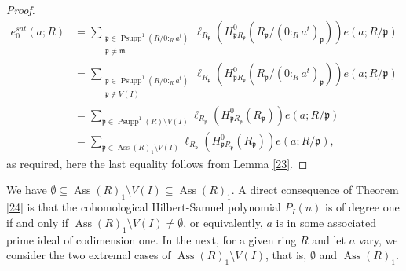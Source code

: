 \documentclass{amsart}
\theoremstyle {definition}
\theoremstyle {remark}
\begin{document}
\begin{proof}
\begin{displaymath}
\begin{split}
e^{sat}_0(a; R)
&= \sum_{\substack{{\ensuremath{\mathfrak p}} \in {\operatorname{Psupp}}^1(R/0:_Ra^t) \\ {\ensuremath{\mathfrak p}} \not={\ensuremath{\mathfrak m}}}}
\ell_{R_{\ensuremath{\mathfrak p}} }(H_{{\ensuremath{\mathfrak p}} R_{\ensuremath{\mathfrak p}} }^0(R_{\ensuremath{\mathfrak p}}/(0:_Ra^t)_{\ensuremath{\mathfrak p}}))e(a; R/{\ensuremath{\mathfrak p}} )\\
&= \sum_{\substack{{\ensuremath{\mathfrak p}} \in {\operatorname{Psupp}}^1(R/0:_Ra^t) \\ {\ensuremath{\mathfrak p}} \not\in V(I)}}
\ell_{R_{\ensuremath{\mathfrak p}} }(H_{{\ensuremath{\mathfrak p}} R_{\ensuremath{\mathfrak p}} }^0(R_{\ensuremath{\mathfrak p}}/(0:_Ra^t)_{\ensuremath{\mathfrak p}}))e(a; R/{\ensuremath{\mathfrak p}} )\\
&=\sum_{{\ensuremath{\mathfrak p}} \in {\operatorname{Psupp}}^1(R)\setminus V(I)}
\ell_{R_{\ensuremath{\mathfrak p}} }(H_{{\ensuremath{\mathfrak p}} R_{\ensuremath{\mathfrak p}} }^0(R_{\ensuremath{\mathfrak p}}))e(a; R/{\ensuremath{\mathfrak p}})\\
&=\sum_{{\ensuremath{\mathfrak p}} \in {\operatorname{Ass}}(R)_1\setminus V(I)}
\ell_{R_{\ensuremath{\mathfrak p}} }(H_{{\ensuremath{\mathfrak p}} R_{\ensuremath{\mathfrak p}} }^0(R_{\ensuremath{\mathfrak p}}))e(a; R/{\ensuremath{\mathfrak p}}),
\end{split}
\end{displaymath}
as required, here the last equality follows from Lemma \ref{23}.
\end{proof}

We have $\emptyset \subseteq {\operatorname{Ass}}(R)_1\setminus V(I)\subseteq {\operatorname{Ass}}(R)_1$. A direct consequence of Theorem \ref{24} is that the cohomological Hilbert-Samuel polynomial $P_I(n)$ is of degree one if and only if ${\operatorname{Ass}}(R)_1\setminus V(I)\not=\emptyset$, or equivalently, $a$ is in some associated prime ideal of codimension one. In the next, for a given ring $R$ and let $a$ vary, we consider the two extremal cases of ${\operatorname{Ass}}(R)_1\setminus V(I)$, that is, $\emptyset$ and ${\operatorname{Ass}}(R)_1$.
\end{document}
